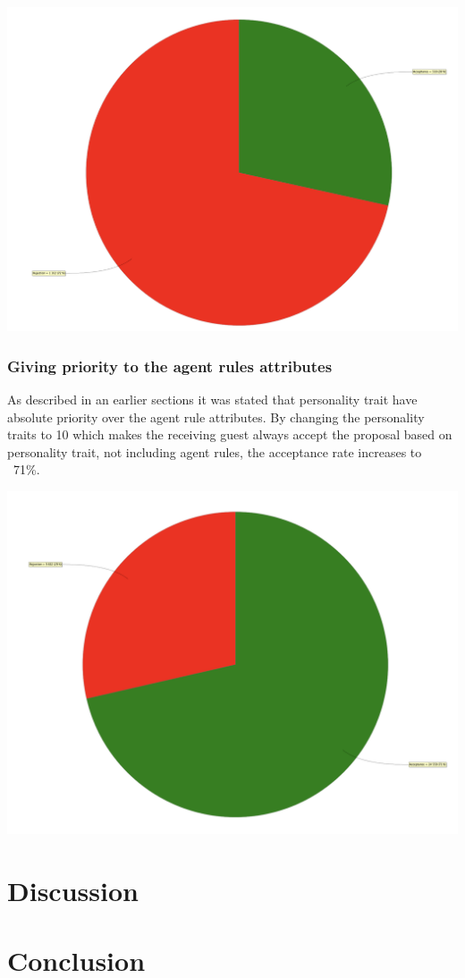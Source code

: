 \documentclass[a4paper,10pt]{article}
\begin{document}
\begin{center}{}
\centering\includegraphics[scale=0.05]{notimelimit.png}\par
\end{center}

\subsubsection{Giving priority to the agent rules attributes}
As described in an earlier sections it was stated that personality trait have absolute priority over the agent rule attributes. By changing the personality traits to 10 which makes the receiving guest always accept the proposal based on personality trait, not including agent rules, the acceptance rate increases to ~71\%.

\begin{center}{}
\centering\includegraphics[scale=0.05]{priority.png}\par
\end{center}

\section{Discussion}

\section{Conclusion}
\end{document}
